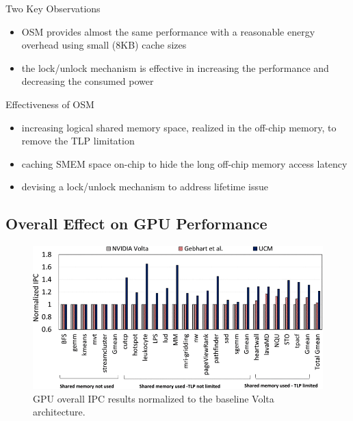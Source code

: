 \documentclass[
    fontset=fandol,
    xcolor=svgnames %
]{ctexbeamer}
\begin{document}
\begin{frame}

    \begin{block}{Two Key Observations}
        \begin{itemize}
            \item OSM provides almost the same performance with a reasonable energy overhead using small (8KB) cache sizes
            \item the lock/unlock mechanism is effective in increasing the performance and decreasing the consumed power
        \end{itemize}
    \end{block}

    \begin{block}{Effectiveness of OSM}
        \begin{itemize}
            \item increasing logical shared memory space, realized in the off-chip memory, to remove the TLP limitation
            \item caching SMEM space on-chip to hide the long off-chip memory access latency
            \item devising a lock/unlock mechanism to address lifetime issue
        \end{itemize}
    \end{block}

\end{frame}

\subsection{Overall Effect on GPU Performance}

\begin{frame}

    \begin{figure}
        \includegraphics[width=1\textwidth]{assets/figure/sadro13-3154315-large.png}
        \caption{GPU overall IPC results normalized to the baseline Volta architecture.}
    \end{figure}

\end{frame}
\end{document}
